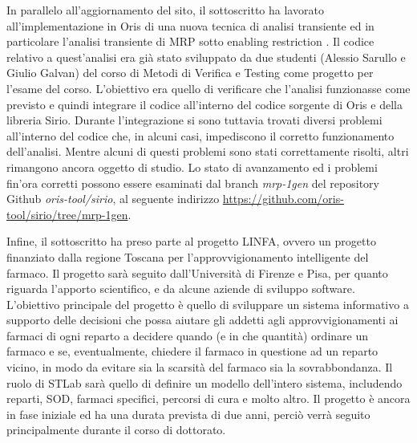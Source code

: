 \documentclass{article}
\begin{document}
    In parallelo all'aggiornamento del sito, il sottoscritto ha lavorato all'implementazione in Oris di una nuova tecnica di analisi transiente ed in particolare l'analisi transiente di MRP sotto enabling restriction \cite{german1995transient}. Il codice relativo a quest'analisi era già stato sviluppato da due studenti (Alessio Sarullo e Giulio Galvan) del corso di Metodi di Verifica e Testing come progetto per l'esame del corso. L'obiettivo era quello di verificare che l'analisi funzionasse come previsto e quindi integrare il codice all'interno del codice sorgente di Oris e della libreria Sirio. Durante l'integrazione si sono tuttavia trovati diversi problemi all'interno del codice che, in alcuni casi, impediscono il corretto funzionamento dell'analisi. Mentre alcuni di questi problemi sono stati correttamente risolti, altri rimangono ancora oggetto di studio. Lo stato di avanzamento ed i problemi fin'ora corretti possono essere esaminati dal branch \textit{mrp-1gen} del repository Github \textit{oris-tool/sirio}, al seguente indirizzo \url{https://github.com/oris-tool/sirio/tree/mrp-1gen}.
    
    Infine, il sottoscritto ha preso parte al progetto LINFA, ovvero un progetto finanziato dalla regione Toscana per l'approvvigionamento intelligente del farmaco. Il progetto sarà seguito dall'Università di Firenze e Pisa, per quanto riguarda l'apporto scientifico, e da alcune aziende di sviluppo software. L'obiettivo principale del progetto è quello di sviluppare un sistema informativo a supporto delle decisioni che possa aiutare gli addetti agli approvvigionamenti ai farmaci di ogni reparto a decidere quando (e in che quantità) ordinare un farmaco e se, eventualmente, chiedere il farmaco in questione ad un reparto vicino, in modo da evitare sia la scarsità del farmaco sia la sovrabbondanza. Il ruolo di STLab sarà quello di definire un modello dell'intero sistema, includendo reparti, SOD, farmaci specifici, percorsi di cura e molto altro. Il progetto è ancora in fase iniziale ed ha una durata prevista di due anni, perciò verrà seguito principalmente durante il corso di dottorato.
    
    \clearpage
    
	
	
\end{document}
